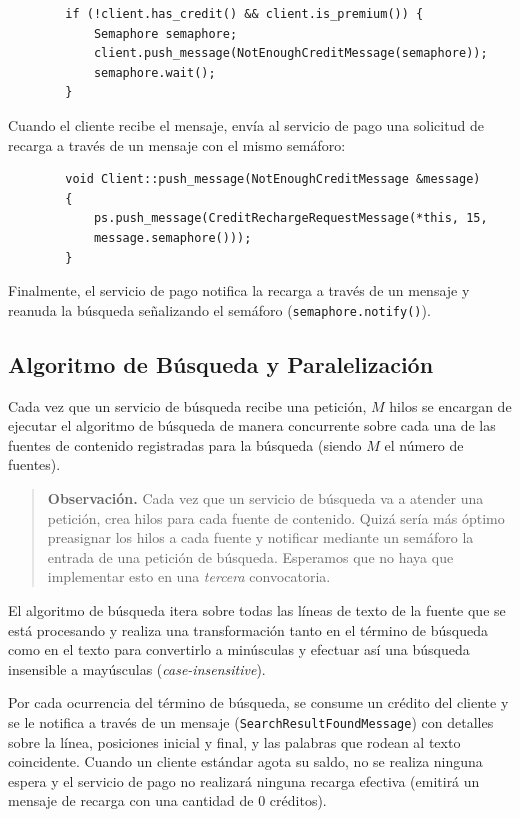\documentclass[a4paper]{article}
\begin{document}
	\begin{verbatim}
		if (!client.has_credit() && client.is_premium()) {
		    Semaphore semaphore;
		    client.push_message(NotEnoughCreditMessage(semaphore));
		    semaphore.wait();
		}
	\end{verbatim}
	
	Cuando el cliente recibe el mensaje, envía al servicio de pago una solicitud de recarga a través de un mensaje con el mismo semáforo: 
	
	\begin{verbatim}
		void Client::push_message(NotEnoughCreditMessage &message)
		{
		    ps.push_message(CreditRechargeRequestMessage(*this, 15,
		    message.semaphore()));
		}
	\end{verbatim}
	
	Finalmente, el servicio de pago notifica la recarga a través de un mensaje y reanuda la búsqueda señalizando el semáforo (\texttt{semaphore.notify()}).
	
	\subsection{Algoritmo de Búsqueda y Paralelización}
	
	Cada vez que un servicio de búsqueda recibe una petición, $M$ hilos se encargan de ejecutar el algoritmo de búsqueda de manera concurrente sobre cada una de las fuentes de contenido registradas para la búsqueda (siendo $M$ el número de fuentes).
	
	\begin{quotation}
		\textbf{Observación.} Cada vez que un servicio de búsqueda va a atender una petición, crea hilos para cada fuente de contenido. Quizá sería más óptimo preasignar los hilos a cada fuente y notificar mediante un semáforo la entrada de una petición de búsqueda. Esperamos que no haya que implementar esto en una \textit{tercera} convocatoria.
	\end{quotation}
	
	El algoritmo de búsqueda itera sobre todas las líneas de texto de la fuente que se está procesando y realiza una transformación tanto en el término de búsqueda como en el texto para convertirlo a minúsculas y efectuar así una búsqueda insensible a mayúsculas (\textit{case-insensitive}).
	
	Por cada ocurrencia del término de búsqueda, se consume un crédito del cliente y se le notifica a través de un mensaje (\texttt{SearchResultFoundMessage}) con detalles sobre la línea, posiciones inicial y final, y las palabras que rodean al texto coincidente. Cuando un cliente estándar agota su saldo, no se realiza ninguna espera y el servicio de pago no realizará ninguna recarga efectiva (emitirá un mensaje de recarga con una cantidad de $0$ créditos).
	
\end{document}
